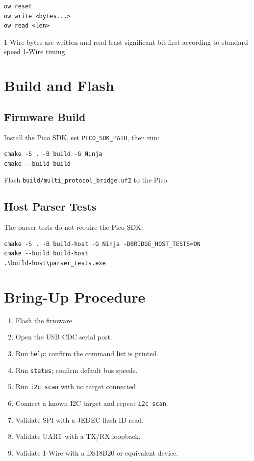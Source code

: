 \documentclass[11pt]{article}
\begin{document}
\begin{lstlisting}[style=bridge]
ow reset
ow write <bytes...>
ow read <len>
\end{lstlisting}

1-Wire bytes are written and read least-significant bit first according to standard-speed 1-Wire timing.

\section{Build and Flash}

\subsection{Firmware Build}

Install the Pico SDK, set \texttt{PICO\_SDK\_PATH}, then run:

\begin{lstlisting}[style=bridge]
cmake -S . -B build -G Ninja
cmake --build build
\end{lstlisting}

Flash \texttt{build/multi\_protocol\_bridge.uf2} to the Pico.

\subsection{Host Parser Tests}

The parser tests do not require the Pico SDK:

\begin{lstlisting}[style=bridge]
cmake -S . -B build-host -G Ninja -DBRIDGE_HOST_TESTS=ON
cmake --build build-host
.\build-host\parser_tests.exe
\end{lstlisting}

\section{Bring-Up Procedure}

\begin{enumerate}[nosep]
  \item Flash the firmware.
  \item Open the USB CDC serial port.
  \item Run \texttt{help}; confirm the command list is printed.
  \item Run \texttt{status}; confirm default bus speeds.
  \item Run \texttt{i2c scan} with no target connected.
  \item Connect a known I2C target and repeat \texttt{i2c scan}.
  \item Validate SPI with a JEDEC flash ID read.
  \item Validate UART with a TX/RX loopback.
  \item Validate 1-Wire with a DS18B20 or equivalent device.
\end{enumerate}
\end{document}
